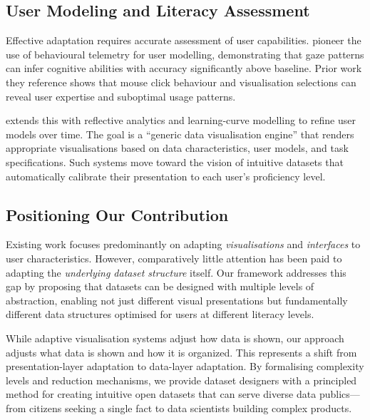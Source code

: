 \documentclass[12pt,a4paper]{article}
\begin{document}
\subsection{User Modeling and Literacy Assessment}

\noindent Effective adaptation requires accurate assessment of user capabilities. \citet{steichen2013useradaptiveinformationvisualisation} pioneer the use of behavioural telemetry for user modelling, demonstrating that gaze patterns can infer cognitive abilities with accuracy significantly above baseline. Prior work they reference shows that mouse click behaviour and visualisation selections can reveal user expertise and suboptimal usage patterns.

\vspace{1em}

\noindent \citet{amyrotos2021adaptivevisualisationsfor} extends this with reflective analytics and learning-curve modelling to refine user models over time. The goal is a ``generic data visualisation engine'' that renders appropriate visualisations based on data characteristics, user models, and task specifications. Such systems move toward the vision of intuitive datasets that automatically calibrate their presentation to each user's proficiency level.

\subsection{Positioning Our Contribution}

\noindent Existing work focuses predominantly on adapting \textit{visualisations} and \textit{interfaces} to user characteristics. However, comparatively little attention has been paid to adapting the \textit{underlying dataset structure} itself. Our framework addresses this gap by proposing that datasets can be designed with multiple levels of abstraction, enabling not just different visual presentations but fundamentally different data structures optimised for users at different literacy levels.

\vspace{1em}

\noindent While adaptive visualisation systems adjust how data is shown, our approach adjusts what data is shown and how it is organized. This represents a shift from presentation-layer adaptation to data-layer adaptation. By formalising complexity levels and reduction mechanisms, we provide dataset designers with a principled method for creating intuitive open datasets that can serve diverse data publics---from citizens seeking a single fact to data scientists building complex products.
\end{document}
